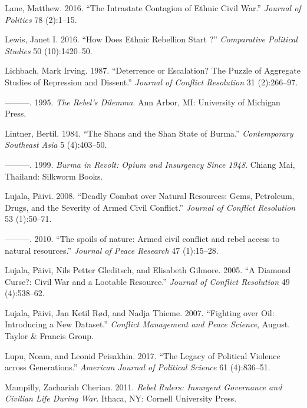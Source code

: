 \documentclass[12pt,]{book}
\theoremstyle{definition}
\theoremstyle{definition}
\theoremstyle{definition}
\theoremstyle{remark}
\begin{document}
\leavevmode\hypertarget{ref-Lane2016}{}%
Lane, Matthew. 2016. ``The Intrastate Contagion of Ethnic Civil War.''
\emph{Journal of Politics} 78 (2):1--15.

\leavevmode\hypertarget{ref-Lewis2016}{}%
Lewis, Janet I. 2016. ``How Does Ethnic Rebellion Start ?''
\emph{Comparative Political Studies} 50 (10):1420--50.

\leavevmode\hypertarget{ref-Lichbach1987}{}%
Lichbach, Mark Irving. 1987. ``Deterrence or Escalation? The Puzzle of
Aggregate Studies of Repression and Dissent.'' \emph{Journal of Conflict
Resolution} 31 (2):266--97.

\leavevmode\hypertarget{ref-Lichbach1995}{}%
---------. 1995. \emph{The Rebel's Dilemma}. Ann Arbor, MI: University
of Michigan Press.

\leavevmode\hypertarget{ref-Lintner1984}{}%
Lintner, Bertil. 1984. ``The Shans and the Shan State of Burma.''
\emph{Contemporary Southeast Asia} 5 (4):403--50.

\leavevmode\hypertarget{ref-Lintner1999}{}%
---------. 1999. \emph{Burma in Revolt: Opium and Insurgency Since
1948}. Chiang Mai, Thailand: Silkworm Books.

\leavevmode\hypertarget{ref-Lujala2008}{}%
Lujala, Päivi. 2008. ``Deadly Combat over Natural Resources: Gems,
Petroleum, Drugs, and the Severity of Armed Civil Conflict.''
\emph{Journal of Conflict Resolution} 53 (1):50--71.

\leavevmode\hypertarget{ref-Lujala2010}{}%
---------. 2010. ``The spoils of nature: Armed civil conflict and rebel
access to natural resources.'' \emph{Journal of Peace Research} 47
(1):15--28.

\leavevmode\hypertarget{ref-Lujala2005}{}%
Lujala, Päivi, Nils Petter Gleditsch, and Elisabeth Gilmore. 2005. ``A
Diamond Curse?: Civil War and a Lootable Resource.'' \emph{Journal of
Conflict Resolution} 49 (4):538--62.

\leavevmode\hypertarget{ref-Lujala2007}{}%
Lujala, Päivi, Jan Ketil Rød, and Nadja Thieme. 2007. ``Fighting over
Oil: Introducing a New Dataset.'' \emph{Conflict Management and Peace
Science}, August. Taylor \& Francis Group.

\leavevmode\hypertarget{ref-Lupu2017a}{}%
Lupu, Noam, and Leonid Peisakhin. 2017. ``The Legacy of Political
Violence across Generations.'' \emph{American Journal of Political
Science} 61 (4):836--51.

\leavevmode\hypertarget{ref-Mampilly2011}{}%
Mampilly, Zachariah Cherian. 2011. \emph{Rebel Rulers: Insurgent
Governance and Civilian Life During War}. Ithaca, NY: Cornell University
Press.
\end{document}
